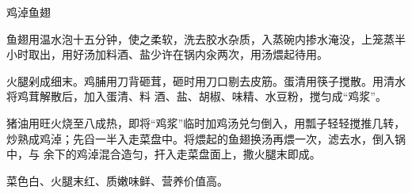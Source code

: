 \begin{recipe}{鸡淖鱼翅}

\ingredients


\preparation

\step 鱼翅用温水泡十五分钟，使之柔软，洗去胶水杂质，入蒸碗内掺水淹没，上笼蒸半
小时取出，用好汤加料酒、盐少许在锅内汆两次，用汤煨起待用。

\step 火腿剁成细末。鸡脯用刀背砸茸，砸时用刀口剔去皮筋。蛋清用筷子搅散。用清水
将鸡茸解散后，加入蛋清、料 酒、盐、胡椒、味精、水豆粉，搅匀成“鸡浆”。

\step 猪油用旺火烧至八成热，即将“鸡浆”临时加鸡汤兑匀倒入，用瓢子轻轻搅推几转，
炒熟成鸡淖；先舀一半入走菜盘中。将煨起的鱼翅换汤再煨一次，滤去水，倒入锅中，与
余下的鸡淖混合造匀，扞入走菜盘面上，撒火腿末即成。

\features

菜色白、火腿末红、质嫩味鲜、营养价值高。

\end{recipe}


